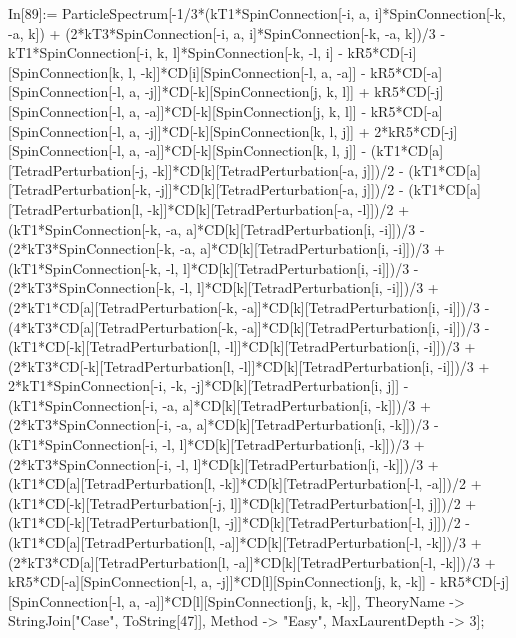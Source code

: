 In[89]:= ParticleSpectrum[-1/3*(kT1*SpinConnection[-i, a, i]*SpinConnection[-k, -a, k]) + (2*kT3*SpinConnection[-i, a, i]*SpinConnection[-k, -a, k])/3 - kT1*SpinConnection[-i, k, l]*SpinConnection[-k, -l, i] - kR5*CD[-i][SpinConnection[k, l, -k]]*CD[i][SpinConnection[-l, a, -a]] - kR5*CD[-a][SpinConnection[-l, a, -j]]*CD[-k][SpinConnection[j, k, l]] + kR5*CD[-j][SpinConnection[-l, a, -a]]*CD[-k][SpinConnection[j, k, l]] - kR5*CD[-a][SpinConnection[-l, a, -j]]*CD[-k][SpinConnection[k, l, j]] + 2*kR5*CD[-j][SpinConnection[-l, a, -a]]*CD[-k][SpinConnection[k, l, j]] - (kT1*CD[a][TetradPerturbation[-j, -k]]*CD[k][TetradPerturbation[-a, j]])/2 - (kT1*CD[a][TetradPerturbation[-k, -j]]*CD[k][TetradPerturbation[-a, j]])/2 - (kT1*CD[a][TetradPerturbation[l, -k]]*CD[k][TetradPerturbation[-a, -l]])/2 + (kT1*SpinConnection[-k, -a, a]*CD[k][TetradPerturbation[i, -i]])/3 - (2*kT3*SpinConnection[-k, -a, a]*CD[k][TetradPerturbation[i, -i]])/3 + (kT1*SpinConnection[-k, -l, l]*CD[k][TetradPerturbation[i, -i]])/3 - (2*kT3*SpinConnection[-k, -l, l]*CD[k][TetradPerturbation[i, -i]])/3 + (2*kT1*CD[a][TetradPerturbation[-k, -a]]*CD[k][TetradPerturbation[i, -i]])/3 - (4*kT3*CD[a][TetradPerturbation[-k, -a]]*CD[k][TetradPerturbation[i, -i]])/3 - (kT1*CD[-k][TetradPerturbation[l, -l]]*CD[k][TetradPerturbation[i, -i]])/3 + (2*kT3*CD[-k][TetradPerturbation[l, -l]]*CD[k][TetradPerturbation[i, -i]])/3 + 2*kT1*SpinConnection[-i, -k, -j]*CD[k][TetradPerturbation[i, j]] - (kT1*SpinConnection[-i, -a, a]*CD[k][TetradPerturbation[i, -k]])/3 + (2*kT3*SpinConnection[-i, -a, a]*CD[k][TetradPerturbation[i, -k]])/3 - (kT1*SpinConnection[-i, -l, l]*CD[k][TetradPerturbation[i, -k]])/3 + (2*kT3*SpinConnection[-i, -l, l]*CD[k][TetradPerturbation[i, -k]])/3 + (kT1*CD[a][TetradPerturbation[l, -k]]*CD[k][TetradPerturbation[-l, -a]])/2 + (kT1*CD[-k][TetradPerturbation[-j, l]]*CD[k][TetradPerturbation[-l, j]])/2 + (kT1*CD[-k][TetradPerturbation[l, -j]]*CD[k][TetradPerturbation[-l, j]])/2 - (kT1*CD[a][TetradPerturbation[l, -a]]*CD[k][TetradPerturbation[-l, -k]])/3 + (2*kT3*CD[a][TetradPerturbation[l, -a]]*CD[k][TetradPerturbation[-l, -k]])/3 + kR5*CD[-a][SpinConnection[-l, a, -j]]*CD[l][SpinConnection[j, k, -k]] - kR5*CD[-j][SpinConnection[-l, a, -a]]*CD[l][SpinConnection[j, k, -k]], TheoryName -> StringJoin["Case", ToString[47]], Method -> "Easy", MaxLaurentDepth -> 3]; 
